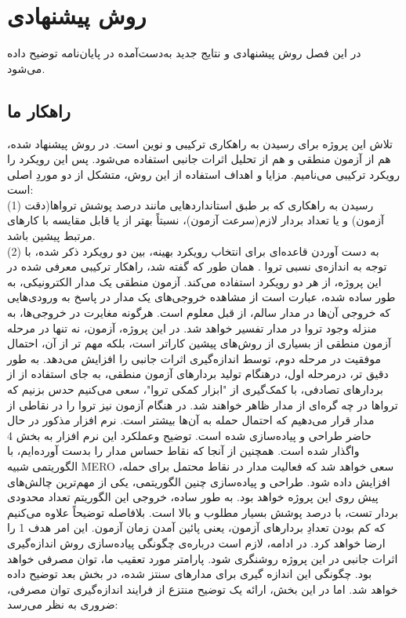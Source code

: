 \chapter{روش پیشنهادی}
در این فصل روش پیشنهادی و نتایج جدید به‌دست‌آمده در پایان‌نامه توضیح داده می‌شود.
\section{راهکار ما}
تلاش این پروژه برای رسیدن به راهکاری ترکیبی و نوین است. در روش پیشنهاد شده، هم از آزمون منطقی و هم از تحلیل اثرات جانبی استفاده می‌شود. پس این رویکرد را رویکرد ترکیبی می‌نامیم. مزایا و اهداف استفاده از این روش، متشکل از دو موردِ اصلی است: \\
(1) رسیدن به راهکاری که بر طبق استانداردهایی مانند درصد پوشش تروا‌ها(دقت آزمون) و یا تعداد بردار لازم(سرعت آزمون)، نسبتاً بهتر از یا قابل مقایسه با کارهای مرتبط پیشین باشد. \\
(2) به دست آوردن قاعده‌ای برای انتخاب رویکرد بهینه، بین دو رویکرد ذکر شده، با توجه به اندازه‌ی نسبی تروا . 
همان طور که گفته شد، راهکار ترکیبی معرفی شده در این پروژه، از هر دو رویکرد استفاده می‌کند. آزمون منطقی یک مدار الکترونیکی، به طور ساده شده، عبارت است از مشاهده خروجی‌های یک مدار در پاسخ به ورودی‌هایی که خروجی آن‌ها در مدار سالم، از قبل معلوم است. هرگونه مغایرت در خروجی‌ها، به منزله وجود تروا در مدار تفسیر خواهد شد. در این پروژه، آزمون، نه تنها در مرحله آزمون منطقی از بسیاری از روش‌های پیشین کاراتر است، بلکه مهم تر از آن، احتمال موفقیت در مرحله دوم، توسط اندازه‌گیری اثرات جانبی را افزایش می‌دهد. به طور دقیق تر، درمرحله اول، درهنگام تولید بردارهای آزمون منطقی، به جای استفاده از از بردارهای تصادفی، با کمک‌گیری از "ابزار کمکی تروا"، سعی می‌کنیم حدس بزنیم که تروا‌ها در چه گره‌ای از مدار ظاهر خواهند شد. در هنگام آزمون نیز تروا را در نقاطی از مدار قرار می‌دهیم که احتمال حمله به آن‌ها‌‌ بیشتر است. نرم افزار مذکور در حال حاضر طراحی و پیاده‌سازی شده است. توضیح وعملکرد این نرم افزار به بخش 4 واگذار شده است. همچنین از آنجا که نقاط حساس مدار را بدست آورده‌ایم، با الگوریتمی شبیه MERO سعی خواهد شد که فعالیت مدار در نقاط محتمل برای حمله، افزایش داده شود. طراحی و پیاده‌سازی چنین الگوریتمی، یکی از مهم‌ترین چالش‌های پیش روی این پروژه خواهد بود. به طور ساده، خروجی این الگوریتم تعداد محدودی بردار تست، با درصد پوشش بسیار مطلوب و بالا است. بلافاصله توضیحاً علاوه می‌کنیم که کم بودن تعدادِ بردارهای آزمون، یعنی پائین آمدن زمان آزمون. این امر هدف 1 را ارضا خواهد کرد.
در ادامه، لازم است درباره‌ی چگونگی پیاده‌سازی روش اندازه‌گیری اثرات جانبی در این پروژه روشنگری شود. پارامتر مورد تعقیب ما، توان مصرفی خواهد بود. چگونگی این اندازه گیری برای مدارهای سنتز شده، در بخش بعد توضیح داده خواهد شد. اما در این بخش، ارائه یک توضیح منتزع از فرایند اندازه‌گیری توان مصرفی، ضروری به نظر می‌رسد:
